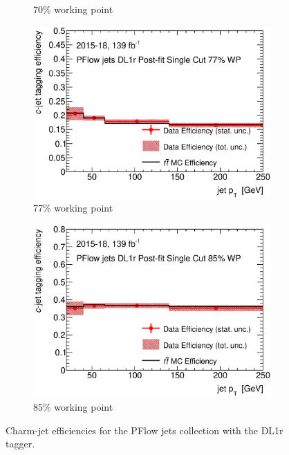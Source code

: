 \documentclass[twoside,11pt]{report}
\begin{document}
\begin{figure}[htbp]
\begin{subfigure}[t]{.35\linewidth}
    \caption{70\% working point}
    \end{subfigure}
    \begin{subfigure}[t]{.35\linewidth}
    \includegraphics[width=1\textwidth]{FTAG_plots/DL1rallPFlowDec/eff77.eps}
    \caption{77\% working point}
    \end{subfigure}
    \begin{subfigure}[t]{.35\linewidth}
    \includegraphics[width=1\textwidth]{FTAG_plots/DL1rallPFlowDec/eff85.eps}
    \caption{85\% working point}
    \end{subfigure}
    \caption{Charm-jet efficiencies for the PFlow jets collection with
    the DL1r tagger.} \label{fig:Dec_eff_PFlow_DL1r}
    \end{figure}
\end{document}
